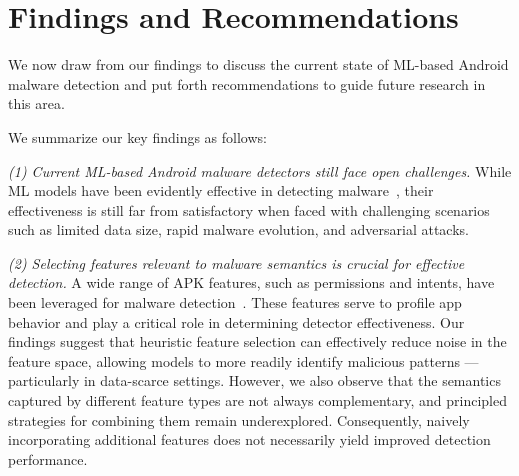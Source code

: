 \section{Findings and Recommendations}
\label{sec:findings}
We now draw from our findings to discuss the current state of ML-based Android malware detection and put forth recommendations to guide future research in this area.

We summarize our key findings as follows:

\noindent \textit{(1) Current ML-based Android malware detectors still face open challenges.}
While ML models have been evidently effective in detecting malware~\cite{he2022msdroid,kim2018multimodal,li2021robust,mariconti2016mamadroid}, their effectiveness is still far from satisfactory when faced with challenging scenarios such as limited data size, rapid malware evolution, and adversarial attacks.

\noindent \textit{(2) Selecting features relevant to malware semantics is crucial for effective detection.}
A wide range of APK features, such as permissions and intents, have been leveraged for malware detection~\cite{xu2018deeprefiner,arp2014drebin,kim2018multimodal}.
These features serve to profile app behavior and play a critical role in determining detector effectiveness.
Our findings suggest that heuristic feature selection can effectively reduce noise in the feature space, allowing models to more readily identify malicious patterns --- particularly in data-scarce settings.
However, we also observe that the semantics captured by different feature types are not always complementary, and principled strategies for combining them remain underexplored.
Consequently, naively incorporating additional features does not necessarily yield improved detection performance.

